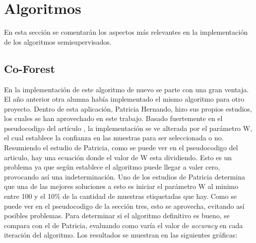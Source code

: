 \section{Algoritmos}
En esta sección se comentarán los aspectos más relevantes en la implementación de los algoritmos semisupervisados.
\subsection{Co-Forest}
En la implementación de este algoritmo de nuevo se parte con una gran ventaja. El año anterior otra alumna había implementado el mismo algoritmo para otro proyecto. Dentro de esta aplicación, Patricia Hernando, hizo sus propios estudios, los cuales se han aprovechado en este trabajo.
Basado fuertemente en el pseudocodigo del artículo \cite{IEEE:CoForest}, la implementación se ve alterada por el parámetro W, el cual establece la confianza en las muestras para ser seleccionada o no. Resumiendo el estudio de Patricia, como se puede ver en el pseudocodigo del articulo, hay una ecuación donde el valor de W esta dividiendo. Esto es un problema ya que según establece el algoritmo puede llegar a valer cero, provocando así una indeterminación. Uno de los estudios de Patricia determina que una de las mejores soluciones a esto es iniciar el parámetro W al minimo entre 100 y el 10\% de la cantidad de muestras etiquetadas que hay. Como se puede ver en el pseudocodigo de la sección tres, esto se aprovecha, evitando así posibles problemas.
Para determinar si el algoritmo definitivo es bueno, se compara con el de Patricia, evaluando como varía el valor de \textit{accuracy} en cada iteración del algoritmo. Los resultados se muestran en las siguientes gráficas:
